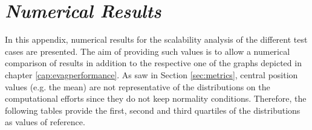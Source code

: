 

\chapter{\textit{Numerical Results}}
\label{cap:appendixB}

In this appendix, numerical results for the scalability analysis of the different test cases are presented. The aim of providing such values is to allow a numerical comparison of results in addition to the respective one of the graphs depicted in chapter  \ref{cap:evagperformance}. As saw in Section \ref{sec:metrics}, central position values (e.g. the mean) are not representative of the distributions on the computational efforts since they do not keep normality conditions. Therefore, the following tables provide the first, second and third quartiles of the distributions as values of reference.


